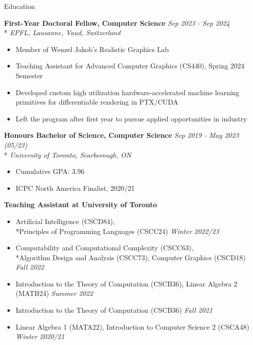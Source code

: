 \documentclass[11pt, letterpaper]{article}
\begin{document}
\begin{section}{Education}

\textbf{First-Year Doctoral Fellow, Computer Science}
\hfill
\textit{Sep 2023 - Sep 2024}\\*
\textit{EPFL, Lausanne, Vaud, Switzerland}
\begin{itemize}
  \item Member of Wenzel Jakob's Realistic Graphics Lab
  \item Teaching Assistant for Advanced Computer Graphics (CS440), Spring 2024 Semester
  \item Developed custom high utilization hardware-accelerated machine learning primitives for differentiable rendering in PTX/CUDA
  \item Left the program after first year to pursue applied opportunities in industry \\
\end{itemize}

\textbf{Honours Bachelor of Science, Computer Science}
\hfill
\textit{Sep 2019 - May 2023 (05/23)}\\*
\textit{University of Toronto, Scarborough, ON}
\begin{itemize}
  \item Cumulative GPA: 3.96
  \item ICPC North America Finalist, 2020/21 \\
\end{itemize}

\textbf{Teaching Assistant at University of Toronto}
\begin{itemize}
  \item Artificial Intelligence (CSCD84), \\*Principles of Programming Languages (CSCC24) \hfill \textit{Winter 2022/23}
  \item Computability and Computational Complexity (CSCC63), \\*Algorithm Design and Analysis (CSCC73), Computer Graphics (CSCD18) \hfill \textit{Fall 2022}
  \item Introduction to the Theory of Computation (CSCB36), Linear Algebra 2 (MATB24) \hfill \textit{Summer 2022}
  \item Introduction to the Theory of Computation (CSCB36) \hfill \textit{Fall 2021}
  \item Linear Algebra 1 (MATA22), Introduction to Computer Science 2 (CSCA48) \hfill \textit{Winter 2020/21}
\end{itemize}

\end{section}
\end{document}
